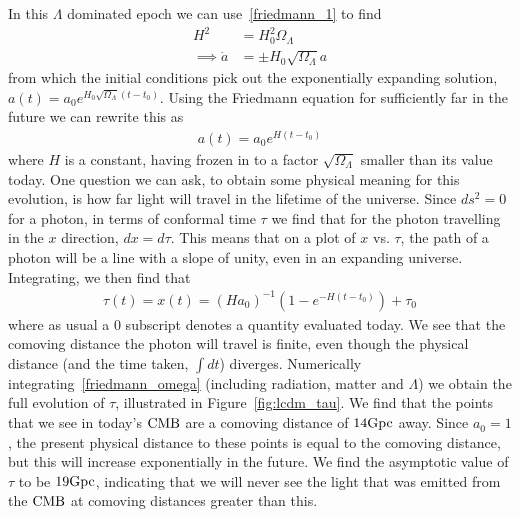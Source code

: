     In this $\Lambda$ dominated epoch we can use~\eqref{friedmann_1}
    to find
    \begin{align}
        H^2 &= H_0^2\Omega_{\Lambda}\\
        \implies \dot{a} &= \pm H_0\sqrt{\Omega_{\Lambda}}a
    \end{align}
    from which the initial conditions pick out the exponentially expanding solution,\\
    ${a(t)=a_0e^{H_0\sqrt{\Omega_{\Lambda}}\left(t-t_0\right)}}$. Using the Friedmann equation
    for sufficiently far in the future we can rewrite this as
    \begin{align}
        a(t)=a_0e^{H\left(t-t_0\right)}
    \end{align}
    where $H$ is a constant, having frozen in to a factor $\sqrt{\Omega_{\Lambda}}$ smaller than
    its value today.
    One question we can ask, to obtain some physical meaning for this evolution,
    is how far light will travel in the lifetime of the universe.
    Since $ds^2=0$ for a photon, in terms of conformal time $\tau$
    we find that for the photon travelling in the $x$ direction, $dx=d\tau$.
    This means that on a plot of $x$ vs. $\tau$, the path of a photon
    will be a line with a slope of unity, even in an expanding universe.
    Integrating, we then find that
    \begin{align}
        \tau(t)=x(t)=(Ha_0)^{-1}\left(1-e^{-H(t-t_0)}\right)+\tau_0
    \end{align}
    where as usual a $0$ subscript denotes a quantity evaluated today.
    We see that the comoving distance the photon will travel is finite, even though the physical
    distance (and the time taken, $\int dt$) diverges.
    Numerically integrating~\eqref{friedmann_omega}
    (including radiation, matter and $\Lambda$) we obtain the full evolution of $\tau$,
    illustrated in Figure~\ref{fig:lcdm_tau}.
    We find that the points that we see in today's $\text{CMB}$ are a comoving distance of $14\text{Gpc}$ away.
    Since $a_0=1$, the present physical distance to these points is equal to the comoving distance,
    but this will increase exponentially in the future.
    We find the asymptotic value of $\tau$ to be $19\text{Gpc}$, indicating that we will never see the
    light that was emitted from the $\text{CMB}$ at comoving distances greater than this.
